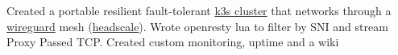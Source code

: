 {Created a portable resilient fault-tolerant \href{https://k3s.io/}{k3s cluster} that networks through a \href{https://www.wireguard.com/}{wireguard} mesh (\href{https://github.com/juanfont/headscale}{headscale}). Wrote openresty lua to filter by SNI and stream Proxy Passed TCP. Created custom monitoring, uptime and a wiki}
